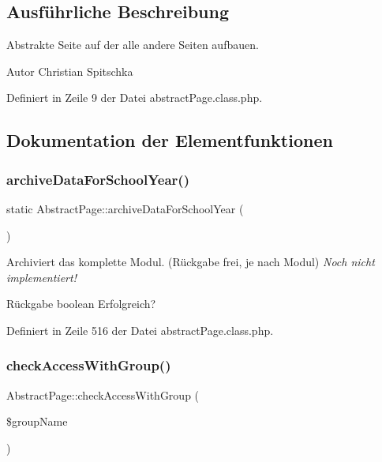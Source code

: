 \subsection{Ausführliche Beschreibung}
Abstrakte Seite auf der alle andere Seiten aufbauen. \begin{DoxyAuthor}{Autor}
Christian Spitschka 
\end{DoxyAuthor}


Definiert in Zeile 9 der Datei abstract\+Page.\+class.\+php.



\subsection{Dokumentation der Elementfunktionen}
\mbox{\label{class_abstract_page_aeb7d1b561582650d56223314cc5d4043}} 
\subsubsection{\texorpdfstring{archive\+Data\+For\+School\+Year()}{archiveDataForSchoolYear()}}
{\footnotesize\ttfamily static Abstract\+Page\+::archive\+Data\+For\+School\+Year (\begin{DoxyParamCaption}{ }\end{DoxyParamCaption})\hspace{0.3cm}{\ttfamily [static]}}

Archiviert das komplette Modul. (Rückgabe frei, je nach Modul) {\itshape Noch nicht implementiert!} \begin{DoxyReturn}{Rückgabe}
boolean Erfolgreich? 
\end{DoxyReturn}


Definiert in Zeile 516 der Datei abstract\+Page.\+class.\+php.

\mbox{\label{class_abstract_page_ae8937960e8881956c8094c89e2e00ac7}} 
\subsubsection{\texorpdfstring{check\+Access\+With\+Group()}{checkAccessWithGroup()}}
{\footnotesize\ttfamily Abstract\+Page\+::check\+Access\+With\+Group (\begin{DoxyParamCaption}\item[{}]{\$group\+Name }\end{DoxyParamCaption})\hspace{0.3cm}{\ttfamily [protected]}}

